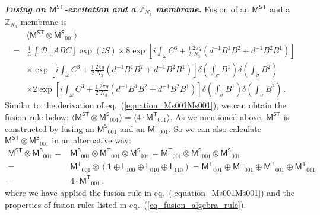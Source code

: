 \documentclass[11pt,nofootinbib,preprint]{revtex4-1}
\begin{document}
\textbf{\textit{Fusing an $\mathsf{M^{ST}}$-excitation and a $\mathbb{Z} _{N_3}$ membrane.}} 
Fusion of an $\mathsf{M^{ST}}$ and a $\mathbb{Z} _{N_3}$ membrane is
\begin{align}
	&\langle \mathsf{M^{ST}}\otimes \mathsf{M^S}_{001} \rangle \nonumber\\
	=&\frac{1}{\mathcal{Z}}\int{\mathcal{D} \left[ ABC\right]  \exp \left( iS \right)} 
	\times 8\exp \left[ i\int_{\omega}{C^3+\frac{1}{2}\frac{2\pi q}{N_3}\left( d^{-1}B^1B^2+d^{-1}B^2B^1 \right)} \right] \nonumber
	\\
	&\times \exp \left[ i\int_{\tilde{\omega}}{C^3+\frac{1}{2}\frac{2\pi q}{N_3}\left( d^{-1}B^1B^2+d^{-1}B^2B^1 \right)} \right] \delta \left( \int_{\sigma}{B^1} \right) \delta \left( \int_{\sigma}{B^2} \right) \nonumber
	\\
	&\times 2\exp \left[ i\int_{\omega}{C^3+\frac{1}{2}\frac{2\pi q}{N_3}\left( d^{-1}B^1B^2+d^{-1}B^2B^1 \right)} \right] \delta \left( \int_{\sigma}{B^1} \right) \delta \left( \int_{\sigma}{B^2} \right) \,.
\end{align}
Similar to the derivation of  eq.~(\ref{equation_Ms001Ms001}),  we can obtain the fusion rule below:
 $	\langle \mathsf{M^{ST}}\otimes \mathsf{M^S}_{001} \rangle =\langle 4\cdot \mathsf{M^T}_{001} \rangle 
$.  As we mentioned above, $\mathsf{M^{ST}}$ is  constructed by fusing an $\mathsf{M^S}_{001}$ and an $\mathsf{M^T}_{001}$. So we can also calculate $\mathsf{M^{ST}}\otimes \mathsf{M^S}_{001}$ in an alternative way:
\begin{align}
	\mathsf{M^{ST}}\otimes \mathsf{M^S}_{001}=&\mathsf{M^S}_{001}\otimes \mathsf{M^T}_{001}\otimes \mathsf{M^S}_{001}=\mathsf{M^T}_{001}\otimes \mathsf{M^S}_{001}\otimes \mathsf{M^S}_{001} \nonumber
	\\
	=&\mathsf{M^T}_{001}\otimes \left(\mathsf{1}\oplus \mathsf{L}_{100}\oplus \mathsf{L}_{010}\oplus \mathsf{L}_{110}\right) 
	=\mathsf{M^T}_{001}\oplus \mathsf{M^T}_{001}\oplus \mathsf{M^T}_{001}\oplus \mathsf{M^T}_{001} \nonumber
	\\
	=&4\cdot \mathsf{M^T}_{001}\,,
\end{align}
where we have applied the fusion rule in eq.~(\ref{equation_Ms001Ms001}) and the properties of fusion rules listed in eq.~(\ref{eq_fusion_algebra_rule}). 
 
\end{document}
